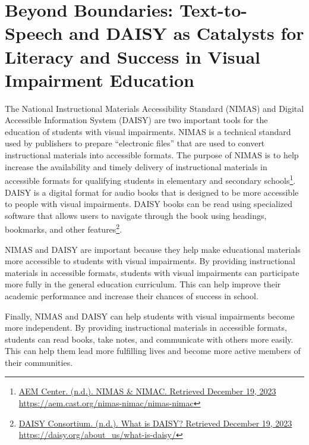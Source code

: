 \hypertarget{audio}{}\chapter[\raggedright Beyond Boundaries:\hfill\break Text-to-Speech and DAISY as Catalysts for Literacy and Success\hfill\break in Visual Impairment Education]{Beyond Boundaries: Text-to-Speech and DAISY as Catalysts for Literacy and Success in Visual Impairment Education}\label{audio}
\minitoc \newpage
{}

The National Instructional Materials Accessibility Standard (NIMAS) and Digital Accessible Information System (DAISY) are two important tools for the education of students with visual impairments. NIMAS is a technical standard used by publishers to prepare “electronic files” that are used to convert instructional materials into accessible formats. The purpose of NIMAS is to help increase the availability and timely delivery of instructional materials in accessible formats for qualifying students in elementary and secondary schools\footnote{\raggedright \href{https://aem.cast.org/nimas-nimac/nimas-nimac}{AEM Center. (n.d.). NIMAS \& NIMAC. Retrieved December 19, 2023} \url{https://aem.cast.org/nimas-nimac/nimas-nimac}}. DAISY is a digital format for audio books that is designed to be more accessible to people with visual impairments. DAISY books can be read using specialized software that allows users to navigate through the book using headings, bookmarks, and other features\footnote{\raggedright \href{https://daisy.org/about_us/what-is-daisy/}{DAISY Consortium. (n.d.). What is DAISY? Retrieved December 19, 2023} \url{https://daisy.org/about_us/what-is-daisy/}}.

NIMAS and DAISY are important because they help make educational materials more accessible to students with visual impairments. By providing instructional materials in accessible formats, students with visual impairments can participate more fully in the general education curriculum. This can help improve their academic performance and increase their chances of success in school.

Finally, NIMAS and DAISY can help students with visual impairments become more independent. By providing instructional materials in accessible formats, students can read books, take notes, and communicate with others more easily. This can help them lead more fulfilling lives and become more active members of their communities.

